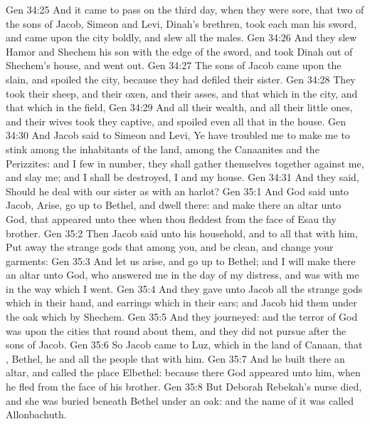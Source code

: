 \vs Gen 34:25 And it came to pass on the third day, when they were sore, that two of the sons of Jacob, Simeon and Levi, Dinah's brethren, took each man his sword, and came upon the city boldly, and slew all the males.
\vs Gen 34:26 And they slew Hamor and Shechem his son with the edge of the sword, and took Dinah out of Shechem's house, and went out.
\vs Gen 34:27 The sons of Jacob came upon the slain, and spoiled the city, because they had defiled their sister.
\vs Gen 34:28 They took their sheep, and their oxen, and their asses, and that which  in the city, and that which  in the field,
\vs Gen 34:29 And all their wealth, and all their little ones, and their wives took they captive, and spoiled even all that  in the house.
\vs Gen 34:30 And Jacob said to Simeon and Levi, Ye have troubled me to make me to stink among the inhabitants of the land, among the Canaanites and the Perizzites: and I  few in number, they shall gather themselves together against me, and slay me; and I shall be destroyed, I and my house.
\vs Gen 34:31 And they said, Should he deal with our sister as with an harlot?
\vs Gen 35:1 And God said unto Jacob, Arise, go up to Bethel, and dwell there: and make there an altar unto God, that appeared unto thee when thou fleddest from the face of Esau thy brother.
\vs Gen 35:2 Then Jacob said unto his household, and to all that  with him, Put away the strange gods that  among you, and be clean, and change your garments:
\vs Gen 35:3 And let us arise, and go up to Bethel; and I will make there an altar unto God, who answered me in the day of my distress, and was with me in the way which I went.
\vs Gen 35:4 And they gave unto Jacob all the strange gods which  in their hand, and  earrings which  in their ears; and Jacob hid them under the oak which  by Shechem.
\vs Gen 35:5 And they journeyed: and the terror of God was upon the cities that  round about them, and they did not pursue after the sons of Jacob.
\vs Gen 35:6 So Jacob came to Luz, which  in the land of Canaan, that , Bethel, he and all the people that  with him.
\vs Gen 35:7 And he built there an altar, and called the place Elbethel: because there God appeared unto him, when he fled from the face of his brother.
\vs Gen 35:8 But Deborah Rebekah's nurse died, and she was buried beneath Bethel under an oak: and the name of it was called Allonbachuth.
